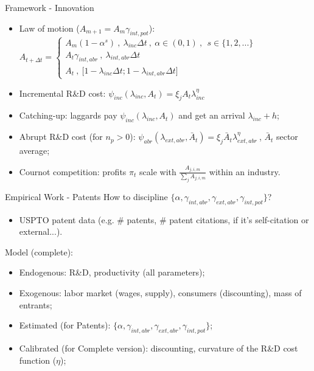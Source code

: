 \documentclass[11pt]{beamer}
\begin{document}
\begin{frame}{Framework - Innovation}
	\begin{itemize}\itemsep10pt	
	\item Law of motion ($A_{m+1} = A_m\gamma_{int, pot}$): $A_{t+\Delta t} =\begin{cases}
               A_m(1-\alpha^{s})\:,\: \lambda_{inc}\Delta t \:,\: \alpha \in (0,1)\:,\:\ s \in \{1, 2, ...\}\\
               A_t\gamma_{int,abr}\:,\: \lambda_{int,abr}\Delta t\\
               A_t \:, \: \big[1 - \lambda_{inc}\Delta t; 1 - \lambda_{int,abr}\Delta t\big] 
    \end{cases}$
	\item Incremental R\&D cost: $\psi_{inc}(\lambda_{inc}, A_{t}) = \xi_j A_t \lambda_{inc}^{\eta}$
	\item Catching-up: laggards pay $\psi_{inc}(\lambda_{inc}, A_{t})$ and get an arrival $\lambda_{inc} + h$;
	\item Abrupt R\&D cost (for $n_p > 0$): $\psi_{abr}(\lambda_{ext,abr}, \bar{A}_{t}) = \xi_j \bar{A}_t \lambda_{ext,abr}^{\eta}\:$, $\bar{A}_{t}$ sector average;
	\item Cournot competition: profits $\pi_t$ scale with $\frac{A_{j,i,m}}{\sum_{j}A_{j,i,m}}$ within an industry.
	\end{itemize}
\end{frame}

\begin{frame}{Empirical Work - Patents}
How to discipline $\{\alpha, \gamma_{int, abr}, \gamma_{ext,abr},\gamma_{int, pot}\}$?
	\begin{itemize}\itemsep12pt	
		\item USPTO patent data (e.g. \# patents, \# patent citations, if it's self-citation or external...).
	\end{itemize}
Model (complete):
	\begin{itemize}
		\item Endogenous: R\&D, productivity (all parameters);
		\item Exogenous: labor market (wages, supply), consumers (discounting), mass of entrants;
		\item Estimated (for Patents): $\{\alpha, \gamma_{int, abr}, \gamma_{ext,abr},\gamma_{int, pot}\}$;
		\item Calibrated (for Complete version): discounting, curvature of the R\&D cost function ($\eta$);
	\end{itemize}
\end{frame}
\end{document}
